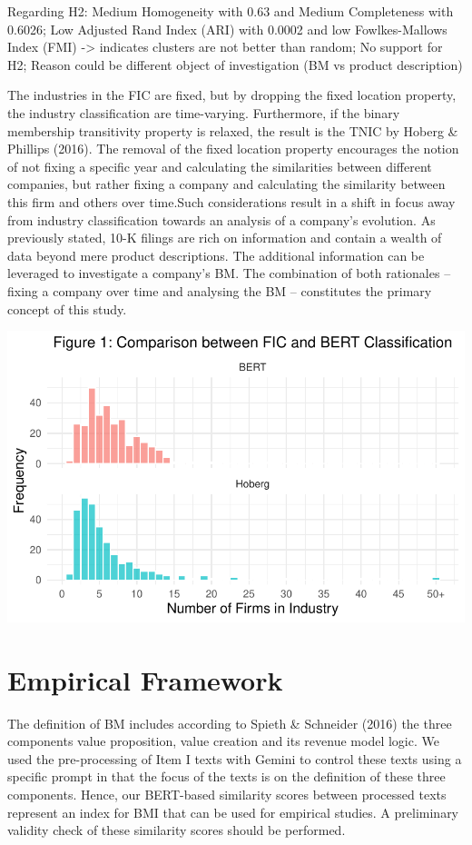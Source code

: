\documentclass[
]{article}
\begin{document}
Regarding H2: Medium Homogeneity with 0.63 and Medium Completeness with
0.6026; Low Adjusted Rand Index (ARI) with 0.0002 and low
Fowlkes-Mallows Index (FMI) -\textgreater{} indicates clusters are not
better than random; No support for H2; Reason could be different object
of investigation (BM vs product description)

The industries in the FIC are fixed, but by dropping the fixed location
property, the industry classification are time-varying. Furthermore, if
the binary membership transitivity property is relaxed, the result is
the TNIC by Hoberg \& Phillips (2016). The removal of the fixed location
property encourages the notion of not fixing a specific year and
calculating the similarities between different companies, but rather
fixing a company and calculating the similarity between this firm and
others over time.Such considerations result in a shift in focus away
from industry classification towards an analysis of a company's
evolution. As previously stated, 10-K filings are rich on information
and contain a wealth of data beyond mere product descriptions. The
additional information can be leveraged to investigate a company's BM.
The combination of both rationales -- fixing a company over time and
analysing the BM -- constitutes the primary concept of this study.

\includegraphics{ProjectEcoDataScience_files/figure-pdf/unnamed-chunk-4-1.pdf}

\section{Empirical Framework}\label{empirical-framework}

The definition of BM includes according to Spieth \& Schneider (2016)
the three components value proposition, value creation and its revenue
model logic. We used the pre-processing of Item I texts with Gemini to
control these texts using a specific prompt in that the focus of the
texts is on the definition of these three components. Hence, our
BERT-based similarity scores between processed texts represent an index
for BMI that can be used for empirical studies. A preliminary validity
check of these similarity scores should be performed.
\end{document}
